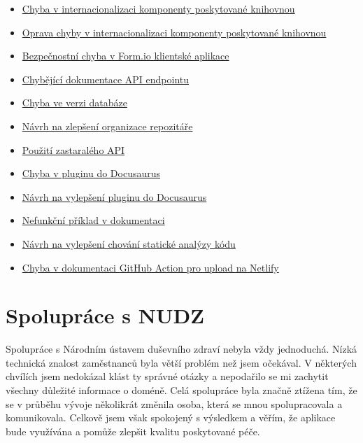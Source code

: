 \begin{itemize}
    \item
    \href{https://github.com/formio/react/issues/522}{Chyba v internacionalizaci komponenty poskytované knihovnou}
    \item
    \href{https://github.com/formio/react/pull/538}{Oprava chyby v internacionalizaci komponenty poskytované knihovnou}
    \item
    \href{https://github.com/formio/formio-app-formio/issues/35}{Bezpečnostní chyba v Form.io klientské aplikace}
    \item
    \href{https://github.com/formio/formio/issues/1555}{Chybějící dokumentace API endpointu}
    \item
    \href{https://github.com/formio/formio/issues/1485}{Chyba ve verzi databáze}
    \item
    \href{https://github.com/formio/formio-app-formio/issues/34}{Návrh na zlepšení organizace repozitáře}
    \item
    \href{https://github.com/formio/react/issues/523}{Použití zastaralého API}
    \item
    \href{https://github.com/tgreyuk/typedoc-plugin-markdown/issues/429}{Chyba v pluginu do Docusaurus}
    \item
    \href{https://github.com/tgreyuk/typedoc-plugin-markdown/issues/440}{Návrh na vylepšení pluginu do Docusaurus}
    \item
    \href{https://github.com/react-bootstrap/react-bootstrap/issues/6671}{Nefunkční příklad v dokumentaci}
    \item
    \href{https://github.com/gajus/eslint-plugin-jsdoc/issues/1138}{Návrh na vylepšení chování statické analýzy kódu}
    \item
    \href{https://github.com/MrFlynn/upload-to-netlify-action/issues/17}{Chyba v dokumentaci GitHub Action pro upload na Netlify}
\end{itemize}


\section{Spolupráce s NUDZ}\label{sec:spoluprace-s-nudz}

Spolupráce s Národním ústavem duševního zdraví nebyla vždy jednoduchá.
Nízká technická znalost zaměstnanců byla větší problém než jsem očekával.
V některých chvílích jsem nedokázal klást ty správné otázky a nepodařilo se mi zachytit všechny důležité informace o doméně.
Celá spolupráce byla značně ztížena tím, že se v průběhu vývoje několikrát změnila osoba, která se mnou spolupracovala a komunikovala.
Celkově jsem však spokojený s výsledkem a věřím, že aplikace bude využívána a pomůže zlepšit kvalitu poskytované péče.

